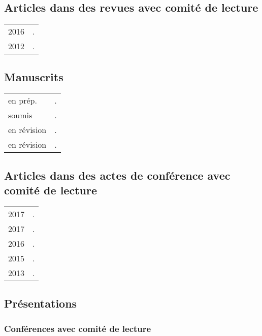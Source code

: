 \documentclass[11pt,a4paper,twoside,french]{article}
\makeatletter
\newenvironment{cvsection}{%
  \setlength{\extrarowheight}{0.70ex}
  \begin{longtable}[l]{@{} L R @{}}
}{%
  \end{longtable}
}
\makeatother
\begin{document}
\subsection*{Articles dans des revues avec comité de lecture}

\begin{cvsection}
  2016 & .\\
  2012 & .\\
\end{cvsection}

\subsection*{Manuscrits}

\begin{cvsection}
  en prép. & .\\
  soumis & .\\
  en révision & .\\
  en révision & .\\
\end{cvsection}

\subsection*{Articles dans des actes de conférence avec comité de lecture}

\begin{cvsection}
  2017 & .\\
  2017 & .\\
  2016 & .\\
  2015 & .\\
  2013 & .\\
\end{cvsection}

\subsection*{Présentations}

\subsubsection*{Conférences avec comité de lecture}
\end{document}
